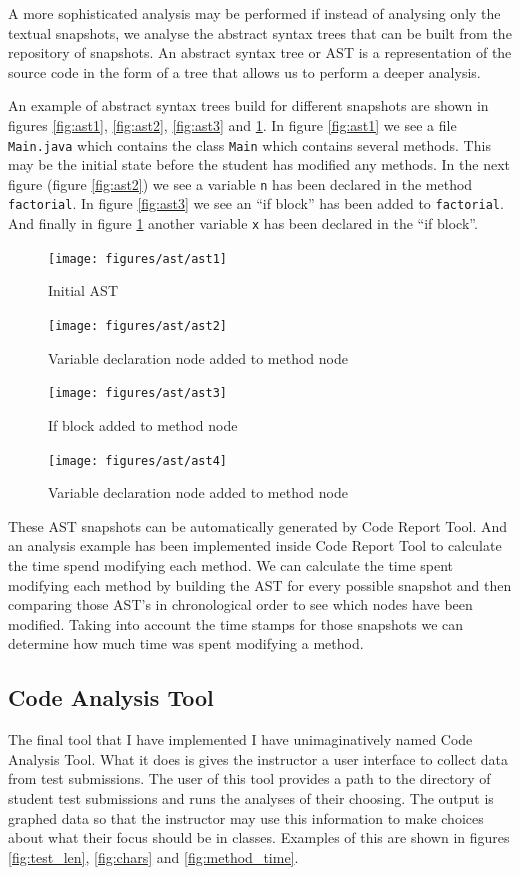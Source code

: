 \documentclass[twocolumn]{article}
\begin{document}
A more sophisticated analysis may be performed if instead of analysing only the
textual snapshots, we analyse the abstract syntax trees that can be built from
the repository of snapshots. An abstract syntax tree or AST is a representation
of the source code in the form of a tree that allows us to perform a deeper
analysis.

An example of abstract syntax trees build for different snapshots are shown in
figures \ref{fig:ast1}, \ref{fig:ast2}, \ref{fig:ast3} and \ref{fig:ast4}. In
figure \ref{fig:ast1} we see a file \texttt{Main.java} which contains the class
\texttt{Main} which contains several methods. This may be the initial state
before the student has modified any methods. In the next figure (figure
\ref{fig:ast2}) we see a variable \texttt{n} has been declared in the method
\texttt{factorial}. In figure \ref{fig:ast3} we see an ``if block'' has been added
to \texttt{factorial}. And finally in figure \ref{fig:ast4} another variable
\texttt{x} has been declared in the ``if block''.

\begin{figure}[h!bt]
\centering
\texttt{[image: figures/ast/ast1]}
\caption{Initial AST}
\label{fig:ast1}
\centering
\texttt{[image: figures/ast/ast2]}
\caption{Variable declaration node added to method node}
\label{fig:ast2}
\centering
\texttt{[image: figures/ast/ast3]}
\caption{If block added to method node}
\label{fig:ast3}
\centering
\texttt{[image: figures/ast/ast4]}
\caption{Variable declaration node added to method node}
\label{fig:ast4}
\end{figure}

These AST snapshots can be automatically generated by Code Report Tool. And an
analysis example has been implemented inside Code Report Tool to calculate the
time spend modifying each method. We can calculate the time spent modifying
each method by building the AST for every possible snapshot and then comparing
those AST's in chronological order to see which nodes have been modified.
Taking into account the time stamps for those snapshots we can determine how
much time was spent modifying a method.

\subsection{Code Analysis Tool}
The final tool that I have implemented I have unimaginatively named Code
Analysis Tool. What it does is gives the instructor a user interface to collect
data from test submissions. The user of this tool provides a path to the
directory of student test submissions and runs the analyses of their choosing.
The output is graphed data so that the instructor may use this information to
make choices about what their focus should be in classes. Examples of this are
shown in figures \ref{fig:test_len}, \ref{fig:chars} and \ref{fig:method_time}.
\end{document}
